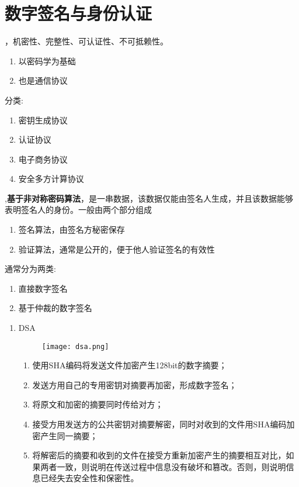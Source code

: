 \chapter{数字签名与身份认证}

，机密性、完整性、可认证性、不可抵赖性。

\begin{enumerate}
	\item 以密码学为基础
	\item 也是通信协议
\end{enumerate}
分类:
\begin{enumerate}
	\item 密钥生成协议
	\item 认证协议
	\item 电子商务协议
	\item 安全多方计算协议
\end{enumerate}

,\textbf{基于非对称密码算法}，是一串数据，该数据仅能由签名人生成，并且该数据能够表明签名人的身份。一般由两个部分组成
\begin{enumerate}
	\item 签名算法，由签名方秘密保存
	\item 验证算法，通常是公开的，便于他人验证签名的有效性
\end{enumerate}
通常分为两类:
\begin{enumerate}
	\item 直接数字签名
	\item 基于仲裁的数字签名
\end{enumerate}

\begin{enumerate}
	\item DSA
	\begin{figure}[H]
		\centering
		\texttt{[image: dsa.png]}
	\end{figure}
	\begin{enumerate}
		\item 使用SHA编码将发送文件加密产生128bit的数字摘要； 
		\item 发送方用自己的专用密钥对摘要再加密，形成数字签名； 
		\item 将原文和加密的摘要同时传给对方； 
		\item 接受方用发送方的公共密钥对摘要解密，同时对收到的文件用SHA编码加密产生同一摘要； 
		\item 将解密后的摘要和收到的文件在接受方重新加密产生的摘要相互对比，如果两者一致，则说明在传送过程中信息没有破坏和篡改。否则，则说明信息已经失去安全性和保密性。
	\end{enumerate}
\end{enumerate}